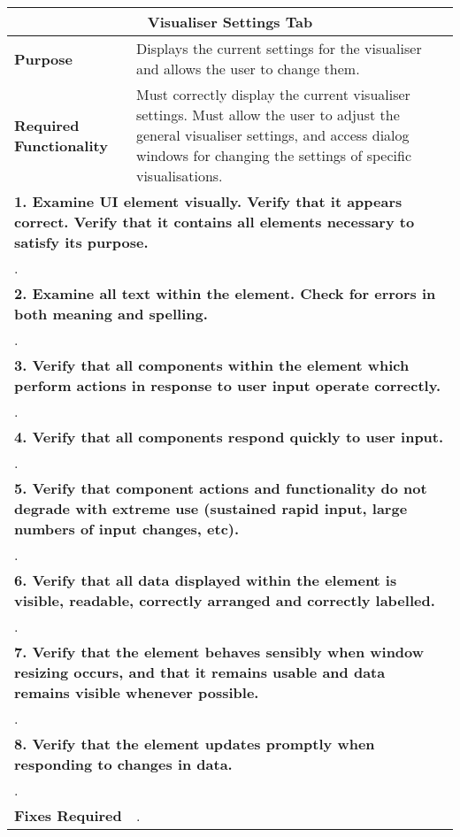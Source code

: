 \begin{longtable}{ l p{10cm} }
 \hline
 \multicolumn{2}{c}{\textbf{Visualiser Settings Tab}}\\
 \hline
 \textbf{Purpose} & Displays the current settings for the visualiser and allows the user to change them.\\
 \textbf{Required Functionality} & Must correctly display the current visualiser settings. Must allow the user to adjust the general visualiser settings, and access dialog windows for changing the settings of specific visualisations.\\
 \hline
 \multicolumn{2}{p{14cm}}{\textbf{1. Examine UI element visually. Verify that it appears correct. Verify that it contains all elements necessary to satisfy its purpose.}}\\
 \multicolumn{2}{p{14cm}}{.}\\
 \hline
 \multicolumn{2}{p{14cm}}{\textbf{2. Examine all text within the element. Check for errors in both meaning and spelling.}}\\
 \multicolumn{2}{p{14cm}}{.}\\
 \hline
 \multicolumn{2}{p{14cm}}{\textbf{3. Verify that all components within the element which perform actions in response to user input operate correctly.}}\\
 \multicolumn{2}{p{14cm}}{.}\\
 \hline
 \multicolumn{2}{p{14cm}}{\textbf{4. Verify that all components respond quickly to user input.}}\\
 \multicolumn{2}{p{14cm}}{.}\\
 \hline
 \multicolumn{2}{p{14cm}}{\textbf{5. Verify that component actions and functionality do not degrade with extreme use (sustained rapid input, large numbers of input changes, etc).}}\\
 \multicolumn{2}{p{14cm}}{.}\\
 \hline
 \multicolumn{2}{p{14cm}}{\textbf{6. Verify that all data displayed within the element is visible, readable, correctly arranged and correctly labelled.}}\\
 \multicolumn{2}{p{14cm}}{.}\\
 \hline
 \multicolumn{2}{p{14cm}}{\textbf{7. Verify that the element behaves sensibly when window resizing occurs, and that it remains usable and data remains visible whenever possible.}}\\
 \multicolumn{2}{p{14cm}}{.}\\
 \hline
 \multicolumn{2}{p{14cm}}{\textbf{8. Verify that the element updates promptly when responding to changes in data.}}\\
 \multicolumn{2}{p{14cm}}{.}\\
 \hline
 \textbf{Fixes Required} & .\\
 \bottomrule
\end{longtable}

